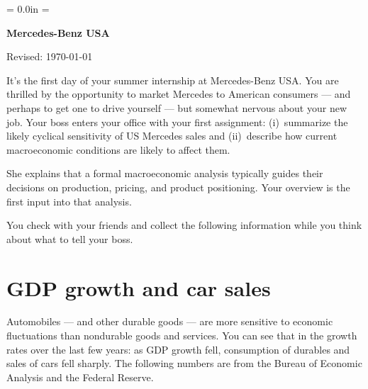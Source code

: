 \documentclass[letterpaper,12pt]{article}
\def\HeadName{Mercedes-Benz USA}
\begin{document}
\parindent = 0.0in
\parskip = \bigskipamount
\thispagestyle{empty}%
\Head

\centerline{\large \bf \HeadName}%
\centerline{Revised:  \today}

\medskip
It's the first day of your summer internship at Mercedes-Benz USA.
You are thrilled by the opportunity to market Mercedes
to American consumers --- and perhaps to get one to drive yourself ---
but somewhat nervous about your new job.
Your boss enters your office with your first assignment:
(i)~summarize the likely cyclical sensitivity of US Mercedes sales
and (ii)~describe how current macroeconomic conditions are likely to affect them.

She explains that a formal macroeconomic analysis
typically guides their decisions on production,
pricing, and product positioning.
Your overview is the first input into that analysis.



You check with your friends and collect the following information
while you think about what to tell your boss.



\section{GDP growth and car sales}

Automobiles --- and other durable goods --- are more sensitive to
economic fluctuations than nondurable goods and services.
You can see that in the growth rates over the last few years:
as GDP growth fell, consumption of durables and sales of cars
fell sharply.
The following numbers are
from the Bureau of Economic Analysis and the Federal Reserve.
\end{document}
